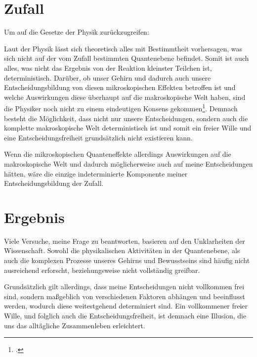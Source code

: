 \documentclass[a4paper, 12pt]{article}
\begin{document}
\section{Zufall}
Um auf die Gesetze der Physik zurückzugreifen:

Laut der Physik lässt sich theoretisch alles mit Bestimmtheit vorhersagen, was sich nicht auf der vom Zufall bestimmten Quantenebene befindet. Somit ist auch alles, was nicht das Ergebnis von der Reaktion kleinster Teilchen ist, deterministisch. Darüber, ob unser Gehirn und dadurch auch unsere Entscheidungsbildung von diesen mikroskopischen Effekten betroffen ist und welche Auswirkungen diese überhaupt auf die makroskopische Welt haben, sind die Physiker noch nicht zu einem eindeutigen Konsens gekommen\footcite[S. 11]{rott}. Demnach besteht die Möglichkeit, dass nicht nur unsere Entscheidungen, sondern auch die komplette makroskopische Welt deterministisch ist und somit ein freier Wille und eine Entscheidungsfreiheit grundsätzlich nicht existieren kann.

Wenn die mikroskopischen Quanteneffekte allerdings Auswirkungen auf die makroskopische Welt und dadurch möglicherweise auch auf meine Entscheidungen hätten, wäre die einzige indeterminierte Komponente meiner Entscheidungsbildung der Zufall.

\section{Ergebnis}
Viele Versuche, meine Frage zu beantworten, basieren auf den Unklarheiten der Wissenschaft. Sowohl die physikalischen Aktivitäten in der Quantenebene, als auch die komplexen Prozesse unseres Gehirns und Bewusstseins sind häufig nicht ausreichend erforscht, beziehungsweise nicht vollständig greifbar.

Grundsätzlich gilt allerdings, dass meine Entscheidungen nicht vollkommen frei sind, sondern maßgeblich von verschiedenen Faktoren abhängen und beeinflusst werden, wodurch diese weitestgehend determiniert sind. Ein vollkommener freier Wille, und folglich auch die Entscheidungsfreiheit, ist demnach eine Illusion, die uns das alltägliche Zusammenleben erleichtert.

\newpage

\nocite{*}
\printbibliography[heading=bibintoc]
\end{document}
